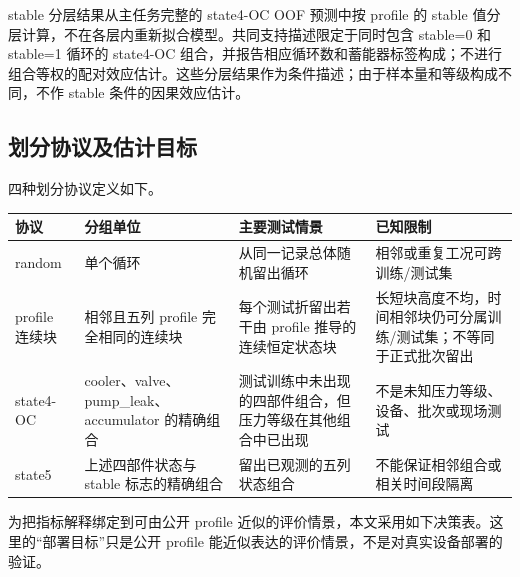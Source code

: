 \documentclass[UTF8,12pt,a4paper]{ctexart}
\newcommand{\toprule}{\hline}
\newcommand{\midrule}{\hline}
\newcommand{\bottomrule}{\hline}
\begin{document}
stable 分层结果从主任务完整的 state4-OC OOF 预测中按 profile 的 stable 值分层计算，不在各层内重新拟合模型。共同支持描述限定于同时包含 stable=0 和 stable=1 循环的 state4-OC 组合，并报告相应循环数和蓄能器标签构成；不进行组合等权的配对效应估计。这些分层结果作为条件描述；由于样本量和等级构成不同，不作 stable 条件的因果效应估计。

\subsection{划分协议及估计目标}
四种划分协议定义如下。

\begin{table}[H]
\centering
\small
\begin{tabularx}{\linewidth}{>{\raggedright\arraybackslash}X >{\raggedright\arraybackslash}X >{\raggedright\arraybackslash}X >{\raggedright\arraybackslash}X}
\toprule
协议 & 分组单位 & 主要测试情景 & 已知限制 \\
\midrule
random & 单个循环 & 从同一记录总体随机留出循环 & 相邻或重复工况可跨训练/测试集 \\
profile 连续块 & 相邻且五列 profile 完全相同的连续块 & 每个测试折留出若干由 profile 推导的连续恒定状态块 & 长短块高度不均，时间相邻块仍可分属训练/测试集；不等同于正式批次留出 \\
state4-OC & cooler、valve、pump\_leak、accumulator 的精确组合 & 测试训练中未出现的四部件组合，但压力等级在其他组合中已出现 & 不是未知压力等级、设备、批次或现场测试 \\
state5 & 上述四部件状态与 stable 标志的精确组合 & 留出已观测的五列状态组合 & 不能保证相邻组合或相关时间段隔离 \\
\bottomrule
\end{tabularx}
\end{table}
为把指标解释绑定到可由公开 profile 近似的评价情景，本文采用如下决策表。这里的“部署目标”只是公开 profile 能近似表达的评价情景，不是对真实设备部署的验证。
\end{document}
